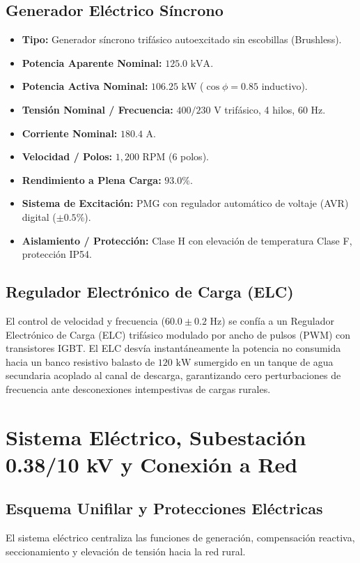 \documentclass[11pt,a4paper]{report}
\begin{document}
\section{Generador Eléctrico Síncrono}
\begin{itemize}
    \item \textbf{Tipo:} Generador síncrono trifásico autoexcitado sin escobillas (Brushless).
    \item \textbf{Potencia Aparente Nominal:} $125.0\text{ kVA}$.
    \item \textbf{Potencia Activa Nominal:} $106.25\text{ kW}$ ($\cos\phi = 0.85$ inductivo).
    \item \textbf{Tensión Nominal / Frecuencia:} $400 / 230\text{ V}$ trifásico, 4 hilos, $60\text{ Hz}$.
    \item \textbf{Corriente Nominal:} $180.4\text{ A}$.
    \item \textbf{Velocidad / Polos:} $1,200\text{ RPM}$ (6 polos).
    \item \textbf{Rendimiento a Plena Carga:} $93.0\%$.
    \item \textbf{Sistema de Excitación:} PMG con regulador automático de voltaje (AVR) digital ($\pm 0.5\%$).
    \item \textbf{Aislamiento / Protección:} Clase H con elevación de temperatura Clase F, protección IP54.
\end{itemize}

\section{Regulador Electrónico de Carga (ELC)}
El control de velocidad y frecuencia ($60.0 \pm 0.2\text{ Hz}$) se confía a un Regulador Electrónico de Carga (ELC) trifásico modulado por ancho de pulsos (PWM) con transistores IGBT. El ELC desvía instantáneamente la potencia no consumida hacia un banco resistivo balasto de $120\text{ kW}$ sumergido en un tanque de agua secundaria acoplado al canal de descarga, garantizando cero perturbaciones de frecuencia ante desconexiones intempestivas de cargas rurales.

\chapter{Sistema Eléctrico, Subestación 0.38/10 kV y Conexión a Red}
\section{Esquema Unifilar y Protecciones Eléctricas}
El sistema eléctrico centraliza las funciones de generación, compensación reactiva, seccionamiento y elevación de tensión hacia la red rural.
\end{document}
